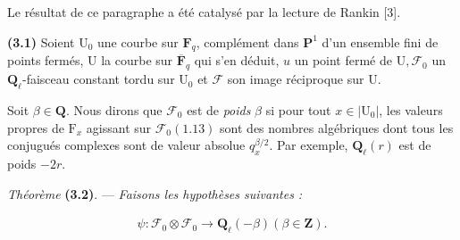 \documentclass[10pt,leqno]{article}
\begin{document}
\noindent Le résultat de ce paragraphe a été catalysé par la lecture de Rankin [3].\par

\noindent \textbf{(3.1)} Soient \(\mathrm{U}_{0}\) une courbe sur \(\mathbf{F}_{q}\), complément dans \(\mathbf{P}^{1}\) d’un ensemble fini de points fermés, \(\mathrm{U}\) la courbe sur \(\overline{\mathbf{F}}_{q}\) qui s’en déduit, \(u\) un point fermé de \(\mathrm{U}, \mathcal{F} _{0}\) un \(\mathbf{Q}_{\ell }\)-faisceau constant tordu sur \(\mathrm{U}_{0}\) et \(\mathcal{F} \) son image réciproque sur \(\mathrm{U}\).\par

\clearpage

\label{physical-13}

\noindent Soit \(\beta \in \mathbf{Q}\). Nous dirons que \(\mathcal{F} _{0}\) est de \emph{poids} \(\beta \) si pour tout \(x\in |\mathrm{U}_{0}|\), les valeurs propres de \(\mathrm{F}_{x}\) agissant sur \(\mathcal{F} _{0} (1.13)\) sont des nombres algébriques dont tous les conjugués complexes sont de valeur absolue \(q_{x}^{\beta /2}\). Par exemple, \(\mathbf{Q}_{\ell }(r)\) est de poids \(- 2r\).\par

\noindent \emph{Théorème} \textbf{(3.2)}. — {\itshape Faisons les hypothèses suivantes :}\par

\par

\begin{equation*}\begin{gathered}\psi  : \mathcal{F} _{0}\otimes \mathcal{F} _{0} \longrightarrow  \mathbf{Q}_{\ell }(- \beta )    (\beta \in \mathbf{Z}).\end{gathered}\end{equation*}

\par

\par
\end{document}
